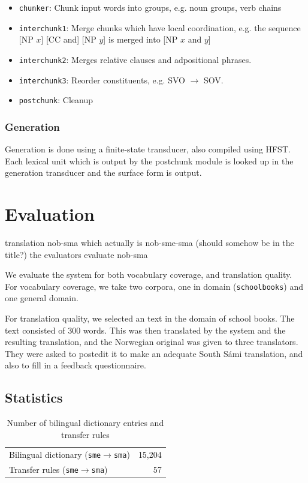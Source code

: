 \documentclass[a4paper,11pt,twocolumn]{article}
\begin{document}
\begin{itemize} 
  \item \texttt{chunker}: Chunk input words into groups, e.g. noun groups, verb chains
  \item \texttt{interchunk1}: Merge chunks which have local coordination, e.g. the sequence [NP $x$] [CC and] [NP $y$] is merged into [NP $x$ and $y$]
  \item \texttt{interchunk2}: Merges relative clauses and adpositional phrases.
  \item \texttt{interchunk3}: Reorder constituents, e.g. SVO $\rightarrow$ SOV.
  \item \texttt{postchunk}: Cleanup
\end{itemize}

\subsubsection{Generation}

Generation is done using a finite-state transducer, also 
compiled using HFST. Each lexical unit which is output by
the postchunk module is looked up in the generation transducer
and the surface form is output.

\section{Evaluation}
 translation nob-sma which actually is nob-sme-sma (should somehow be in the title?) 
 the evaluators evaluate nob-sma

We evaluate the system for both vocabulary coverage, and translation quality.
For vocabulary coverage, we take two corpora, one in domain (\texttt{schoolbooks}) and 
one general domain. 

For translation quality, we selected an text in the domain of school books. The 
text consisted of 300 words. This was then translated by the system and the resulting
translation, and the Norwegian original was given to three translators. They were
 asked to postedit it to make an adequate South Sámi translation, and also to fill
in a feedback questionnaire.

\subsection{Statistics}
\begin{table}
  \begin{center}
    \begin{tabular}{|l|r|}
      \hline
      Bilingual dictionary ({\tt sme}$\rightarrow${\tt sma}) & 15,204 \\ %
      Transfer rules ({\tt sme}$\rightarrow${\tt sma}) & 57 \\
      \hline
    \end{tabular}
    \label{table:transfer}
    \caption{Number of bilingual dictionary entries and transfer rules}
  \end{center}
\end{table}
\end{document}
